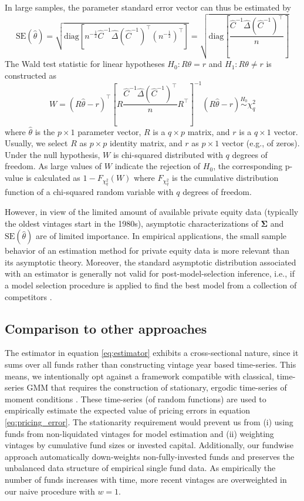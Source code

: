 \documentclass[12pt]{article}
\begin{document}
In large samples, the parameter standard error vector can thus be estimated by
\[
\mathrm{SE}(\hat{\theta}) = 
\sqrt{
	\mathrm{diag} \left[
	n^{-\frac{1}{2}}
	\hat{C}^{-1} \hat{\Delta} (\hat{C}^{-1})^\top
	(n^{-\frac{1}{2}})^\top
	\right] 
}
=
\sqrt{
	\mathrm{diag} \left[
	\frac{\hat{C}^{-1} \hat{\Delta} (\hat{C}^{-1})^\top}{n}
	\right] 
}
\]
The Wald test statistic for linear hypotheses $H_0: R \theta = r$ and $H_1: R \theta \neq r$ is constructed as
\[
W = 
(R \hat{\theta} - r)^\top
\left[
R
\frac{\hat{C}^{-1} \hat{\Delta} (\hat{C}^{-1})^\top}{n}
R^\top
\right]^{-1}
(R \hat{\theta} - r)
\stackrel{H_0}{\sim}
\chi_q^2
\]
where $\hat{\theta}$ is the $p \times 1$ parameter vector, $R$ is a $q \times p$ matrix, and $r$ is a $q \times 1$ vector.
Usually, we select $R$ as $p \times p$ identity matrix, and $r$ as $p \times 1$ vector (e.g., of zeros).
Under the null hypothesis, $W$ is chi-squared distributed with $q$ degrees of freedom. As large values of $W$ indicate the rejection of $H_0$, the corresponding p-value is calculated as $1 - F_{\chi_q^2}(W)$ where $F_{\chi_q^2}$ is the cumulative distribution function of a chi-squared random variable with $q$ degrees of freedom.

However, in view of the limited amount of available private equity data (typically the oldest vintages start in the 1980s), asymptotic characterizations of $\mathbf{\Sigma}$ and $\mathrm{SE}(\hat{\theta})$ are of limited importance. 
In empirical applications, the small sample behavior of an estimation method for private equity data is more relevant than its asymptotic theory.
Moreover, the standard asymptotic distribution associated with an estimator is generally not valid for post-model-selection inference, i.e., if a model selection procedure is applied to find the best model from a collection of competitors \citep{LP05}.


\subsection{Comparison to other approaches}

The estimator in equation \ref{eq:estimator} exhibits a cross-sectional nature, since it sums over all funds rather than constructing vintage year based time-series.
This means, we intentionally opt against a framework compatible with classical, time-series GMM that requires the construction of stationary, ergodic time-series of moment conditions \citep{H82,H12}.
These time-series (of random functions) are used to empirically estimate the expected value of pricing errors in equation \ref{eq:pricing_error}.
The stationarity requirement would prevent us from (i) using funds from non-liquidated vintages for model estimation and (ii) weighting vintages by cumulative fund sizes or invested capital.
Additionally, our fundwise approach automatically down-weights non-fully-invested funds and preserves the unbalanced data structure of empirical single fund data.
As empirically the number of funds increases with time, more recent vintages are overweighted in our naive procedure with $w=1$.
\end{document}
